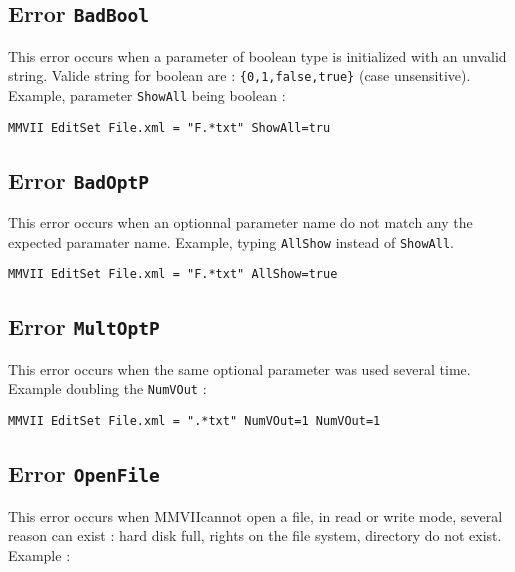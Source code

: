 \documentclass[a4paper]{book}
\newcommand{\PPP}{MMVII}
\begin{document}

\subsection{Error {\tt BadBool}}

This error occurs when a parameter of boolean type is initialized with an unvalid string.
Valide string for boolean are : {\tt \{0,1,false,true\}} (case unsensitive).
Example, parameter {\tt ShowAll} being boolean :

\begin{verbatim}
MMVII EditSet File.xml = "F.*txt" ShowAll=tru
\end{verbatim}


\subsection{Error {\tt BadOptP}}

This error occurs when an optionnal parameter name do not match any the expected
paramater name. Example, typing {\tt AllShow} instead of {\tt ShowAll}.

\begin{verbatim}
MMVII EditSet File.xml = "F.*txt" AllShow=true
\end{verbatim}


\subsection{Error {\tt MultOptP}}

This error occurs when the same optional parameter was used several time. Example doubling the {\tt NumVOut} :

\begin{verbatim}
MMVII EditSet File.xml = ".*txt" NumVOut=1 NumVOut=1
\end{verbatim}


\subsection{Error {\tt OpenFile}}

This error occurs when \PPP cannot open a file, in read or write mode, several reason can exist :
hard disk full, rights on the file system, directory do not exist. Example :
\end{document}
